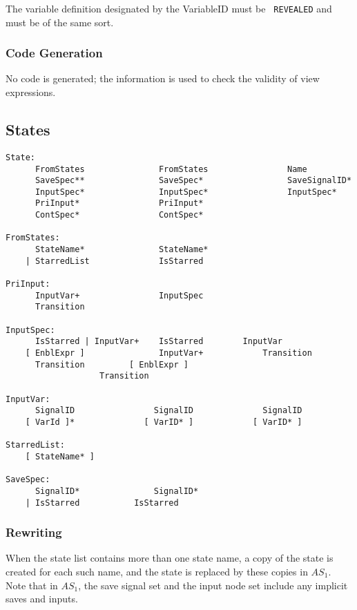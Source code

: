 The variable definition designated by the VariableID must be {\tt
REVEALED} and must be of the same sort.

\subsubsection{Code Generation}

No code is generated; the information is used to check the validity
of view expressions.

\subsection{States}

\begin{verbatim}
State:
      FromStates               FromStates                Name
      SaveSpec**               SaveSpec*                 SaveSignalID*
      InputSpec*               InputSpec*                InputSpec*
      PriInput*                PriInput*
      ContSpec*                ContSpec*

FromStates:
      StateName*               StateName*
    | StarredList              IsStarred

PriInput:
      InputVar+                InputSpec
      Transition

InputSpec:
      IsStarred | InputVar+    IsStarred	    InputVar
    [ EnblExpr ]               InputVar+            Transition
      Transition	     [ EnblExpr ]
			       Transition

InputVar:
      SignalID                SignalID              SignalID
    [ VarId ]*              [ VarID* ]            [ VarID* ]

StarredList:
    [ StateName* ]

SaveSpec:
      SignalID*               SignalID*
    | IsStarred		      IsStarred
\end{verbatim}

\subsubsection{Rewriting}

When the state list contains more than one state name, a copy of the
state is created for each such name, and the state is replaced by
these copies in $AS_1$. Note that in $AS_1$, the save signal set and
the input node set include any implicit saves and inputs.

